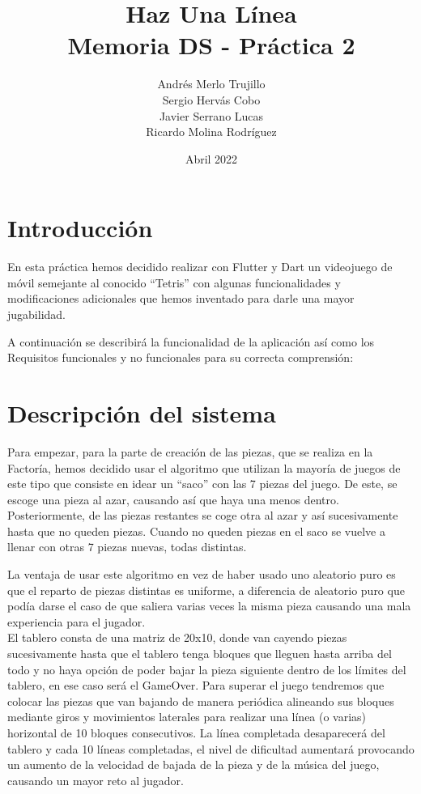 \documentclass{article}
\title{Haz Una Línea\\
\large Memoria DS - Práctica 2}
\author{Andrés Merlo Trujillo\\ Sergio Hervás Cobo\\ Javier Serrano Lucas\\ Ricardo Molina Rodríguez}
\begin{document}
\date{Abril 2022}
\maketitle
\section{Introducción}
En esta práctica hemos decidido realizar con Flutter y Dart un videojuego de móvil
semejante al conocido ``Tetris'' con algunas funcionalidades y modificaciones adicionales
que hemos inventado para darle una mayor jugabilidad.

A continuación se describirá la funcionalidad de la aplicación así como los Requisitos
funcionales y no funcionales para su correcta comprensión:

\section{Descripción del sistema}
Para empezar, para la parte de creación de las piezas, que se realiza en la Factoría, hemos
 decidido usar el algoritmo que utilizan la mayoría de juegos de este tipo que
 consiste en idear un ``saco'' con las 7 piezas del juego. De este, se escoge una pieza al azar,
 causando así que haya una menos dentro. Posteriormente, de las piezas restantes se coge otra al azar
  y así sucesivamente hasta que no queden piezas. Cuando no queden piezas en el saco se vuelve
  a llenar con otras 7 piezas nuevas, todas distintas.

La ventaja de usar este algoritmo en vez de haber usado uno aleatorio puro es
 que el reparto de piezas distintas es uniforme, a diferencia de aleatorio puro
 que podía darse el caso de que saliera varias veces la misma pieza causando una
 mala experiencia para el jugador.\\


El tablero consta de una matriz de 20x10, donde van cayendo piezas sucesivamente
hasta que el tablero tenga bloques que lleguen hasta arriba del todo y no haya
opción de poder bajar la pieza siguiente dentro de los límites del tablero, en
ese caso será el GameOver. Para superar el juego tendremos que colocar
las piezas que van bajando de manera periódica alineando sus bloques mediante
giros y movimientos laterales para realizar una línea (o varias) horizontal de
10 bloques consecutivos. La línea completada desaparecerá del tablero y cada 10 líneas
completadas, el nivel de dificultad aumentará provocando un aumento de la velocidad de
bajada de la pieza y de la música del juego, causando un mayor reto al jugador.\\
\end{document}

